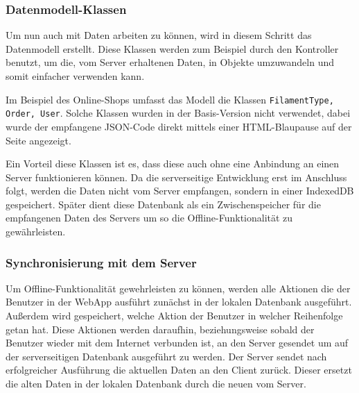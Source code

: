 \documentclass[a4paper,12pt,ngerman,listof=numbered]{scrartcl}      %
\providecommand{\inlinecode}[1]{\texttt{#1}}
\begin{document}
	\subsubsection{Datenmodell-Klassen}
	Um nun auch mit Daten arbeiten zu können, wird in diesem Schritt das Datenmodell erstellt. Diese Klassen werden zum Beispiel durch den Kontroller benutzt, um die, vom Server erhaltenen Daten, in Objekte umzuwandeln und somit einfacher verwenden kann.\par
	Im Beispiel des Online-Shops umfasst das Modell die Klassen \inlinecode{FilamentType, Order, User}. Solche Klassen wurden in der Basis-Version nicht verwendet, dabei wurde der empfangene JSON-Code direkt mittels einer HTML-Blaupause auf der Seite angezeigt.\par
	Ein Vorteil diese Klassen ist es, dass diese auch ohne eine Anbindung an einen Server funktionieren können. Da die serverseitige Entwicklung erst im Anschluss folgt, werden die Daten nicht vom Server empfangen, sondern in einer IndexedDB gespeichert. Später dient diese Datenbank als ein Zwischenspeicher für die empfangenen Daten des Servers um so die Offline-Funktionalität zu gewährleisten.\par
	
	\subsubsection{Synchronisierung mit dem Server}
	Um Offline-Funktionalität gewehrleisten zu können, werden alle Aktionen die der Benutzer in der WebApp ausführt zunächst in der lokalen Datenbank ausgeführt. Außerdem wird gespeichert, welche Aktion der Benutzer in welcher Reihenfolge getan hat. Diese Aktionen werden daraufhin, beziehungsweise sobald der Benutzer wieder mit dem Internet verbunden ist, an den Server gesendet um auf der serverseitigen Datenbank ausgeführt zu werden. Der Server sendet nach erfolgreicher Ausführung die aktuellen Daten an den Client zurück. Dieser ersetzt die alten Daten in der lokalen Datenbank durch die neuen vom Server.\par
	
\end{document}
